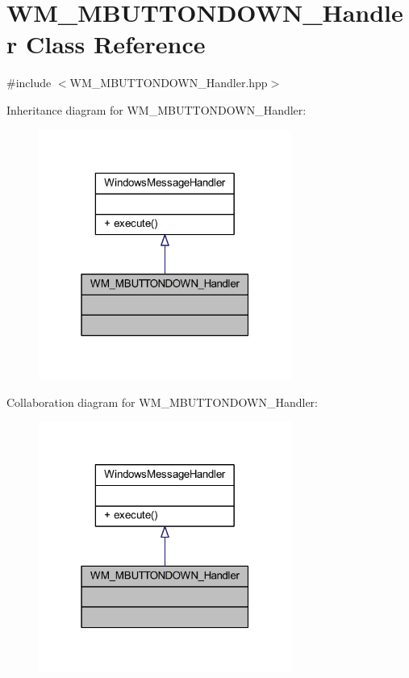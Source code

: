 \hypertarget{class_w_m___m_b_u_t_t_o_n_d_o_w_n___handler}{}\section{W\+M\+\_\+\+M\+B\+U\+T\+T\+O\+N\+D\+O\+W\+N\+\_\+\+Handler Class Reference}
\label{class_w_m___m_b_u_t_t_o_n_d_o_w_n___handler}


{\ttfamily \#include $<$W\+M\+\_\+\+M\+B\+U\+T\+T\+O\+N\+D\+O\+W\+N\+\_\+\+Handler.\+hpp$>$}



Inheritance diagram for W\+M\+\_\+\+M\+B\+U\+T\+T\+O\+N\+D\+O\+W\+N\+\_\+\+Handler\+:\nopagebreak
\begin{figure}[H]
\begin{center}
\leavevmode
\includegraphics[width=235pt]{class_w_m___m_b_u_t_t_o_n_d_o_w_n___handler__inherit__graph}
\end{center}
\end{figure}


Collaboration diagram for W\+M\+\_\+\+M\+B\+U\+T\+T\+O\+N\+D\+O\+W\+N\+\_\+\+Handler\+:\nopagebreak
\begin{figure}[H]
\begin{center}
\leavevmode
\includegraphics[width=235pt]{class_w_m___m_b_u_t_t_o_n_d_o_w_n___handler__coll__graph}
\end{center}
\end{figure}
